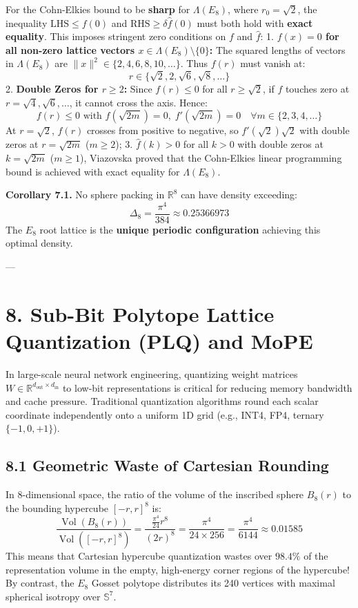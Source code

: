 \documentclass[11pt,twoside,openright]{amsbook}
\begin{document}
For the Cohn-Elkies bound to be \textbf{sharp} for $\Lambda(E_8)$, where $r_0 = \sqrt{2}$, the inequality $\text{LHS} \le f(0)$ and $\text{RHS} \ge \delta \widehat{f}(0)$ must both hold with \textbf{exact equality}. This imposes stringent zero conditions on $f$ and $\widehat{f}$:
1. \textbf{$f(x) = 0$ for all non-zero lattice vectors $x \in \Lambda(E_8) \setminus \{0\}$:}
   The squared lengths of vectors in $\Lambda(E_8)$ are $\|x\|^2 \in \{2, 4, 6, 8, 10, \dots\}$.
   Thus $f(r)$ must vanish at:
   $$r \in \{\sqrt{2}, 2, \sqrt{6}, \sqrt{8}, \dots\}$$
2. \textbf{Double Zeros for $r \ge 2$:}
   Since $f(r) \le 0$ for all $r \ge \sqrt{2}$, if $f$ touches zero at $r = \sqrt{4}, \sqrt{6}, \dots$, it cannot cross the axis. Hence:
   $$f(r) \le 0 \text{ with } f(\sqrt{2m}) = 0, \; f'(\sqrt{2m}) = 0 \quad \forall m \in \{2, 3, 4, \dots\}$$
   At $r = \sqrt{2}$, $f(r)$ crosses from positive to negative, so $f'(\sqrt{2})  \sqrt{2}$ with double zeros at $r = \sqrt{2m}$ ($m \ge 2$);
3. $\widehat{f}(k) > 0$ for all $k > 0$ with double zeros at $k = \sqrt{2m}$ ($m \ge 1$),
Viazovska proved that the Cohn-Elkies linear programming bound is achieved with exact equality for $\Lambda(E_8)$.

\textbf{Corollary 7.1.} No sphere packing in $\mathbb{R}^8$ can have density exceeding:
$$\Delta_8 = \frac{\pi^4}{384} \approx 0.25366973$$
The $E_8$ root lattice is the \textbf{unique periodic configuration} achieving this optimal density.

---

\section{8. Sub-Bit Polytope Lattice Quantization (PLQ) and MoPE}

In large-scale neural network engineering, quantizing weight matrices $W \in \mathbb{R}^{d_{\text{out}} \times d_{\text{in}}}$ to low-bit representations is critical for reducing memory bandwidth and cache pressure. Traditional quantization algorithms round each scalar coordinate independently onto a uniform 1D grid (e.g., INT4, FP4, ternary $\{-1, 0, +1\}$).

\subsection{8.1 Geometric Waste of Cartesian Rounding}

In 8-dimensional space, the ratio of the volume of the inscribed sphere $B_8(r)$ to the bounding hypercube $[-r, r]^8$ is:
$$\frac{\operatorname{Vol}(B_8(r))}{\operatorname{Vol}([-r, r]^8)} = \frac{\frac{\pi^4}{24} r^8}{(2r)^8} = \frac{\pi^4}{24 \times 256} = \frac{\pi^4}{6144} \approx \mathbf{0.01585}$$
This means that Cartesian hypercube quantization wastes over \textbf{$98.4\%$} of the representation volume in the empty, high-energy corner regions of the hypercube!
By contrast, the $E_8$ Gosset polytope distributes its 240 vertices with maximal spherical isotropy over $\mathbb{S}^7$.
\end{document}
